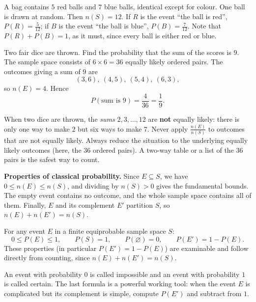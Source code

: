 \documentclass[11pt]{article}
\newcommand{\cle}[1]{{\popxbold\color{popdark}#1}}
\begin{document}
\begin{exemplebox}
A bag contains $5$ red balls and $7$ blue balls, identical except for colour. One ball is drawn at random. Then $n(S) = 12$. If $R$ is the event ``the ball is red'', $P(R) = \frac{5}{12}$; if $B$ is the event ``the ball is blue'', $P(B) = \frac{7}{12}$. Note that $P(R) + P(B) = 1$, as it must, since every ball is either red or blue.
\end{exemplebox}

\begin{exoresolu}
Two fair dice are thrown. Find the probability that the sum of the scores is $9$.
\tcblower
The sample space consists of $6 \times 6 = 36$ equally likely ordered pairs. The outcomes giving a sum of $9$ are
\[
(3,6),\ (4,5),\ (5,4),\ (6,3),
\]
so $n(E) = 4$. Hence
\[
P(\text{sum is } 9) = \frac{4}{36} = \frac{1}{9}.
\]
\end{exoresolu}

\begin{attention}
When two dice are thrown, the \emph{sums} $2, 3, \dots, 12$ are \textbf{not} equally likely: there is only one way to make $2$ but six ways to make $7$. Never apply $\frac{n(E)}{n(S)}$ to outcomes that are not equally likely. Always reduce the situation to the underlying equally likely outcomes (here, the $36$ ordered pairs). A two-way table or a list of the $36$ pairs is the safest way to count.
\end{attention}

\textbf{Properties of classical probability.} Since $E \subseteq S$, we have $0 \le n(E) \le n(S)$, and dividing by $n(S) > 0$ gives the fundamental bounds. The empty event contains no outcome, and the whole sample space contains all of them. Finally, $E$ and its complement $E'$ partition $S$, so $n(E) + n(E') = n(S)$.

\begin{propriete}
For any event $E$ in a finite equiprobable sample space $S$:
\[
0 \le P(E) \le 1, \qquad P(S) = 1, \qquad P(\varnothing) = 0, \qquad P(E') = 1 - P(E).
\]
These properties (in particular $P(E') = 1 - P(E)$) are examinable and follow directly from counting, since $n(E) + n(E') = n(S)$.
\end{propriete}

An event with probability $0$ is called \cle{impossible} and an event with probability $1$ is called \cle{certain}. The last formula is a powerful working tool: when the event $E$ is complicated but its complement is simple, compute $P(E')$ and subtract from $1$.
\end{document}
